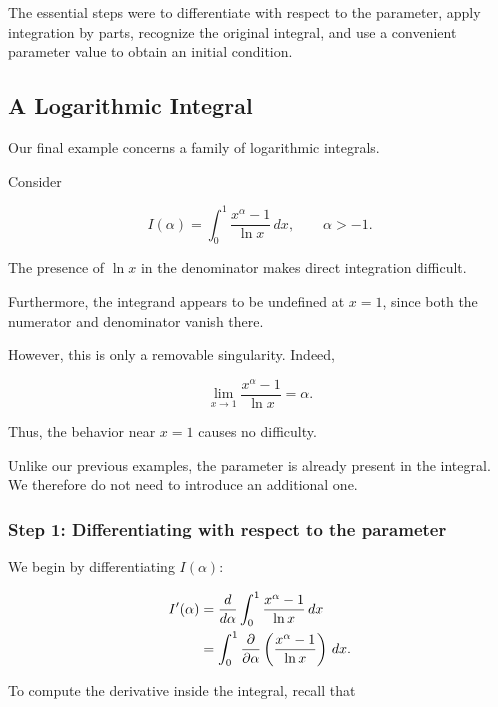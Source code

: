 \documentclass[11pt,a4paper]{article}
\theoremstyle{definition}
\theoremstyle{remark}
\begin{document}
The essential steps were
to differentiate with
respect to the parameter,
apply integration by parts,
recognize the original
integral, and use a
convenient parameter value
to obtain an initial condition.

\subsection{A Logarithmic Integral}

Our final example concerns a
family of logarithmic integrals.

Consider

\begin{equation}
    I(\alpha)
    =
    \int_0^1
    \frac{x^\alpha-1}{\ln x}\,dx,
    \qquad \alpha>-1.
    \label{eq:logarithmic_integral}
\end{equation}

The presence of $\ln x$
in the denominator makes
direct integration difficult.

Furthermore, the integrand
appears to be undefined at
$x=1$, since both the numerator
and denominator vanish there.

However, this is only a
removable singularity. Indeed,

\[
    \lim_{x\to1}
    \frac{x^\alpha-1}{\ln x}
    =
    \alpha.
\]

Thus, the behavior near
$x=1$ causes no difficulty.

Unlike our previous examples,
the parameter is already
present in the integral.
We therefore do not need to
introduce an additional one.

\subsubsection*{Step 1: Differentiating with respect to the parameter}

We begin by differentiating
$I(\alpha)$:

\begin{align}
    I'(\alpha)
    &=
    \frac{d}{d\alpha}
    \int_0^1
    \frac{x^\alpha-1}{\ln x}\,dx
    \notag\\
    &=
    \int_0^1
    \frac{\partial}{\partial\alpha}
    \left(
    \frac{x^\alpha-1}{\ln x}
    \right)\,dx.
\end{align}

To compute the derivative
inside the integral,
recall that
\end{document}
